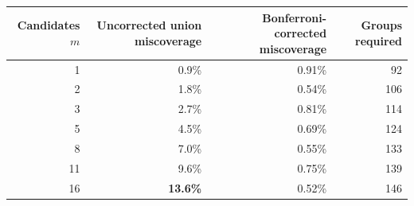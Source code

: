 \begin{tabular}{@{}rrrr@{}}
\toprule
Candidates $m$ & Uncorrected union miscoverage & Bonferroni-corrected miscoverage & Groups required \\
\midrule
1  & 0.9\%           & 0.91\% & 92  \\
2  & 1.8\%           & 0.54\% & 106 \\
3  & 2.7\%           & 0.81\% & 114 \\
5  & 4.5\%           & 0.69\% & 124 \\
8  & 7.0\%           & 0.55\% & 133 \\
11 & 9.6\%           & 0.75\% & 139 \\
16 & \textbf{13.6\%} & 0.52\% & 146 \\
\bottomrule
\end{tabular}
